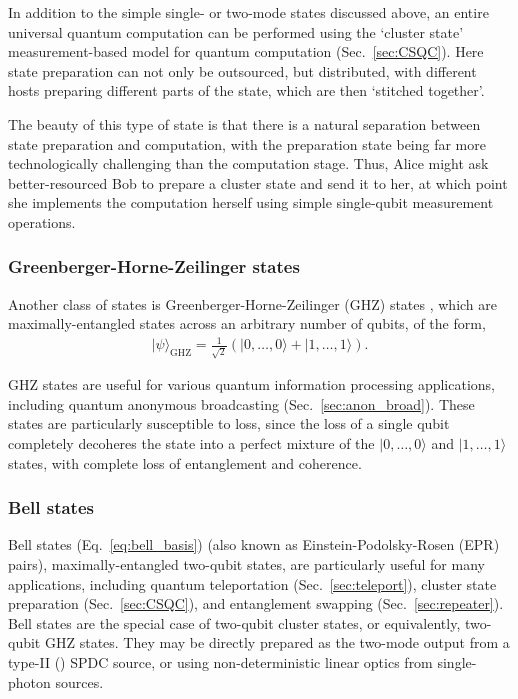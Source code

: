 \documentclass[aps,rmp,twocolumn,amsmath,amssymb,nofootinbib,superscriptaddress,longbibliography,floatfix]{revtex4-1}
\newcommand{\ket}[1]{|#1\rangle}
\newcommand{\comment}[1]{{\color{blue}{\textbf{#1}}}}
\begin{document}
In addition to the simple single- or two-mode states discussed above, an entire universal quantum computation can be performed using the `cluster state' measurement-based model for quantum computation (Sec.~\ref{sec:CSQC}). Here state preparation can not only be outsourced, but distributed, with different hosts preparing different parts of the state, which are then `stitched together'.

The beauty of this type of state is that there is a natural separation between state preparation and computation, with the preparation state being far more technologically challenging than the computation stage. Thus, Alice might ask better-resourced Bob to prepare a cluster state and send it to her, at which point she implements the computation herself using simple single-qubit measurement operations.

%
%

\subsubsection{Greenberger-Horne-Zeilinger states}

Another class of states is Greenberger-Horne-Zeilinger (GHZ) states \cite{???}, which are maximally-entangled states across an arbitrary number of qubits, of the form,
\begin{align}
\ket\psi_\mathrm{GHZ} = \frac{1}{\sqrt{2}}(\ket{0,\dots,0} + \ket{1,\dots,1}).
\end{align}

GHZ states are useful for various quantum information processing applications, including quantum anonymous broadcasting (Sec.~\ref{sec:anon_broad}). These states are particularly susceptible to loss, since the loss of a single qubit completely decoheres the state into a perfect mixture of the \mbox{$\ket{0,\dots,0}$} and \mbox{$\ket{1,\dots,1}$} states, with complete loss of entanglement and coherence.

%
%

\subsubsection{Bell states}

Bell states (Eq.~\ref{eq:bell_basis}) (also known as Einstein-Podolsky-Rosen (EPR) pairs), maximally-entangled two-qubit states, are particularly useful for many applications, including quantum teleportation (Sec.~\ref{sec:teleport}), cluster state preparation (Sec.~\ref{sec:CSQC}), and entanglement swapping (Sec.~\ref{sec:repeater}). Bell states are the special case of two-qubit cluster states, or equivalently, two-qubit GHZ states. They may be directly prepared as the two-mode output from a type-II (\comment{Type-I or type-II???}) SPDC source, or using non-deterministic linear optics from single-photon sources.
\end{document}
